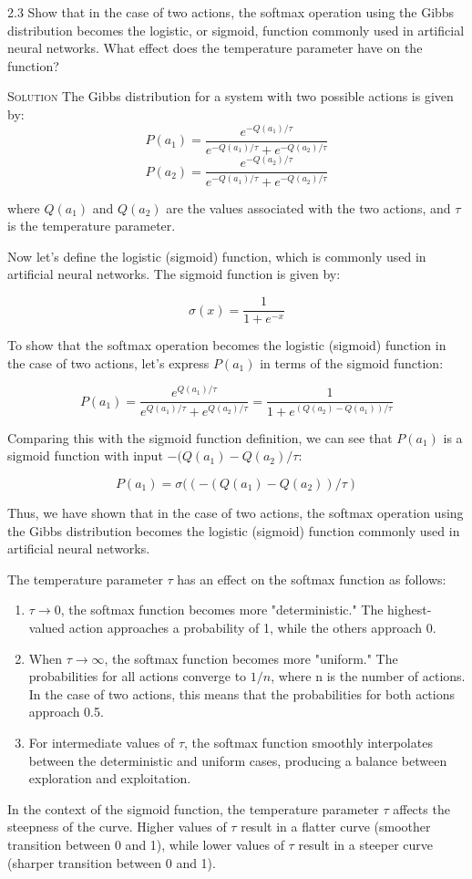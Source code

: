 \documentclass{article}
\begin{document}
2.3 Show that in the case of two actions, the softmax operation 
using the Gibbs distribution becomes the logistic, or sigmoid, 
function commonly used in artificial neural networks. What 
effect does the temperature parameter have on the 
function?

\textsc{Solution} The Gibbs distribution for a system with two 
possible actions is given by:
\[
P(a_1) = \frac{e^{-Q(a_1)/\tau}}{e^{-Q(a_1)/\tau} + 
e^{-Q(a_2)/\tau}}
\]
\[
P(a_2) = \frac{e^{-Q(a_2)/\tau}}{e^{-Q(a_1)/\tau} + 
e^{-Q(a_2)/\tau}}
\]

where $Q(a_1)$ and $Q(a_2)$ are the values associated with the two 
actions, and $\tau$ is the temperature parameter.

Now let's define the logistic (sigmoid) function, which is 
commonly used in artificial neural networks. The sigmoid function is 
given by:

\[
\sigma(x) = \frac{1}{1 + e^{-x}}
\]

To show that the softmax operation becomes the logistic (sigmoid) 
function in the case of two actions, let's express $P(a_1)$ in 
terms of the sigmoid function:

\[
P(a_1) = \frac{e^{Q(a_1)/\tau}}{e^{Q(a_1)/\tau} + 
e^{Q(a_2)/\tau}} = \frac{1}{1 + e^{(Q(a_2) - Q(a_1))/\tau}}
\]

Comparing this with the sigmoid function definition, we can see 
that $P(a_1)$ is a sigmoid function with input $-(Q(a_1) - 
Q(a_2) / \tau$:

\[
P(a_1) = \sigma((-(Q(a_1) - Q(a_2)) / \tau)
\]

Thus, we have shown that in the case of two actions, the softmax 
operation using the Gibbs distribution becomes the logistic 
(sigmoid) function commonly used in artificial neural networks.

The temperature parameter $\tau$ has an effect on the softmax 
function as follows:

\begin{enumerate}
\item $\tau \rightarrow 0$, the softmax function becomes more 
"deterministic." The highest-valued action approaches a 
probability of 1, while the others approach 0.
\item When $\tau \rightarrow \infty$, the softmax function 
becomes more "uniform." The probabilities for all actions 
converge to $1/n$, where n is the number of actions. In the case of 
two actions, this means that the probabilities for both actions 
approach 0.5.
\item For intermediate values of $\tau$, the softmax function 
smoothly interpolates between the deterministic and uniform cases, 
producing a balance between exploration and exploitation.
\end{enumerate}

In the context of the sigmoid 
function, the temperature parameter $\tau$ affects the 
steepness of the curve. Higher values of $\tau$ result in a 
flatter curve (smoother transition between 0 and 1), while lower 
values of $\tau$ result in a steeper curve (sharper transition 
between 0 and 1).
\end{document}
